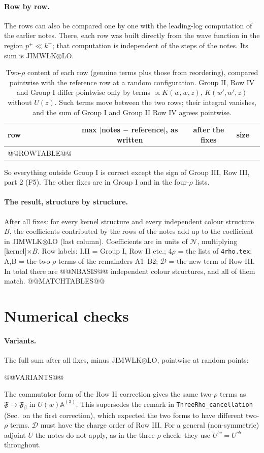 \documentclass[10pt]{article}
\numberwithin{equation}{section}
\newcommand{\NN}{\mathcal N}
\begin{document}
\paragraph{Row by row.} The rows can also be compared one by one with the leading-log computation of the earlier notes. There, each row was built directly from the wave function in the region $p^+\ll k^+$; that computation is independent of the steps of the notes. Its sum is JIMWLK$\otimes$LO.
\begin{table}[h]
\centering\small
\begin{tabular}{@{}l c c c l@{}}
row & max $|$notes $-$ reference$|$, as written & after the fixes & size & \\ \hline
@@ROWTABLE@@
\end{tabular}
\caption{Two-$\rho$ content of each row (genuine terms plus those from reordering), compared pointwise with the reference row at a random configuration. Group II, Row IV and Group I differ pointwise only by terms $\propto K(w,w,z)$, $K(w',w',z)$ without $U(z)$. Such terms move between the two rows; their integral vanishes, and the sum of Group I and Group II Row IV agrees pointwise.}
\label{tab:rows}
\end{table}
So everything outside Group I is correct except the sign of Group III, Row III, part 2 (F5). The other fixes are in Group I and in the four-$\rho$ lists.

\paragraph{The result, structure by structure.} After all fixes: for every kernel structure and every independent colour structure $B$, the coefficients contributed by the rows of the notes add up to the coefficient in JIMWLK$\otimes$LO (last column). Coefficients are in units of $\NN$, multiplying [kernel]$\times B$. Row labels: I.II = Group I, Row II etc.; 4$\rho$ = the lists of \texttt{4rho.tex}; A,B = the two-$\rho$ terms of the remainders A1--B2; $\mathcal D$ = the new term of Row III. In total there are @@NBASIS@@ independent colour structures, and all of them match.
@@MATCHTABLES@@

\section{Numerical checks}\label{sec:num}
\paragraph{Variants.} The full sum after all fixes, minus JIMWLK$\otimes$LO, pointwise at random points:
\begin{center}\small
@@VARIANTS@@
\end{center}
The commutator form of the Row II correction gives the same two-$\rho$ terms as $\mathfrak F\to\mathfrak F_\beta$ in $U(w)\mathbb A^{(3)}$. This supersedes the remark in \texttt{ThreeRho\_cancellation} (Sec.~on the first correction), which expected the two forms to have different two-$\rho$ terms. $\mathcal D$ must have the charge order of Row III. For a general (non-symmetric) adjoint $U$ the notes do not apply, as in the three-$\rho$ check: they use $U^{bc}=U^{cb}$ throughout.
\end{document}

